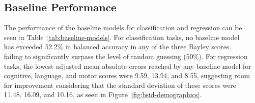 \documentclass[runningheads,a4paper]{llncs}
\begin{document}
\subsection{Baseline Performance}
The performance of the baseline models for classification and regression can be seen in Table~\ref{tab:baseline-models}. For classification tasks, no baseline model has exceeded 52.2\% in balanced accuracy in any of the three Bayley scores, failing to significantly surpass the level of random guessing (50\%). For regression tasks, the lowest adjusted mean absolute errors reached by any baseline model for cognitive, language, and motor scores were 9.59, 13.94, and 8.55, suggesting room for improvement considering that the standard deviation of these scores were 11.48, 16.09, and 10.16, as seen in Figure~\ref{fig:bsid-demographics}.

\end{document}
